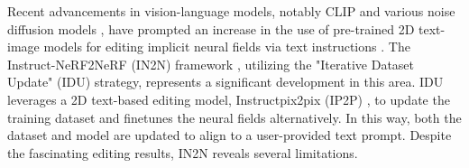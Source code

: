 

Recent advancements in vision-language models, notably CLIP \cite{radford2021learning} and various noise diffusion models \cite{nichol2021glide, rombach2022high, saharia2022photorealistic, ramesh2022hierarchical}, have prompted an increase in the use of pre-trained 2D text-image models for editing implicit neural fields via text instructions \cite{wang2022clip, wang2023nerf, haque2023instruct, fang2023text, mirzaei2023watch}. 
The Instruct-NeRF2NeRF (IN2N) framework \cite{haque2023instruct}, utilizing the "Iterative Dataset Update" (IDU) strategy, represents a significant development in this area.
IDU leverages a 2D text-based editing model, Instructpix2pix (IP2P) \cite{brooks2023instructpix2pix}, to update the training dataset and finetunes the neural fields alternatively. In this way, both the dataset and model are updated to align to a user-provided text prompt. Despite the fascinating editing results, IN2N reveals several limitations.

